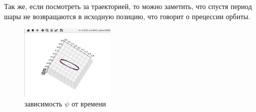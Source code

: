 \documentclass[a4paper, 12pt]{article}
\begin{document}
    Так же, если посмотреть за траекторией, то можно заметить, что спустя период шары не возвращаются в исходную позицию, что говорит о прецессии орбиты.
    
    \begin{figure}[H]
        \centering
        \includegraphics[width = 0.4\textwidth, height = 0.20\textheight]{pictures/data/trace.jpg}
        \caption{зависимость $\psi$ от времени}
       \end{figure}
    
    
 \newpage
 
\end{document}
